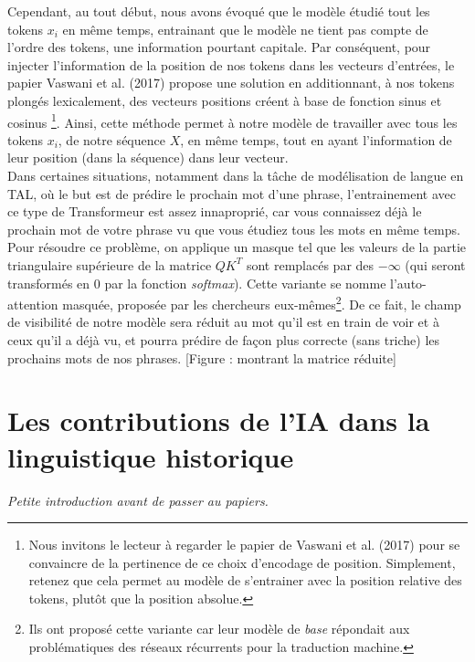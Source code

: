\documentclass[12pt, french, twoside]{report}
\begin{document}
Cependant, au tout début, nous avons évoqué que le modèle étudié tout les tokens $x_i$ en même temps, entrainant que le modèle ne tient pas compte de l'ordre des tokens, une information pourtant capitale. Par conséquent, pour injecter l'information de la position de nos tokens dans les vecteurs d'entrées, le papier Vaswani et al. (2017)\cite{transformer} propose une solution en additionnant, à nos tokens plongés lexicalement, des vecteurs positions créent à base de fonction sinus et cosinus \footnote{Nous invitons le lecteur à regarder le papier de Vaswani et al. (2017)\cite{transformer} pour se convaincre de la pertinence de ce choix d'encodage de position. Simplement, retenez que cela permet au modèle de s'entrainer avec la position relative des tokens, plutôt que la position absolue.}. Ainsi, cette méthode permet à notre modèle de travailler avec tous les tokens $x_i$, de notre séquence $X$, en même temps, tout en ayant l'information de leur position (dans la séquence) dans leur vecteur.\\

Dans certaines situations, notamment dans la tâche de modélisation de langue en TAL, où le but est de prédire le prochain mot d'une phrase, l'entrainement avec ce type de Transformeur est assez innaproprié, car vous connaissez déjà le prochain mot de votre phrase vu que vous étudiez tous les mots en même temps. Pour résoudre ce problème, on applique un masque tel que les valeurs de la partie triangulaire supérieure de la matrice $QK^T$ sont remplacés par des $-\infty$ (qui seront transformés en 0 par la fonction \textit{softmax}). Cette variante se nomme l'auto-attention masquée, proposée par les chercheurs eux-mêmes\footnote{Ils ont proposé cette variante car leur modèle de \textit{base} répondait aux problématiques des réseaux récurrents pour la traduction machine.}. De ce fait, le champ de visibilité de notre modèle sera réduit au mot qu'il est en train de voir et à ceux qu'il a déjà vu, et pourra prédire de façon plus correcte (sans triche) les prochains mots de nos phrases. [Figure : montrant la matrice réduite]

\chapter{Les contributions de l'IA dans la linguistique historique}
\textit{Petite introduction avant de passer au papiers.}
\end{document}
